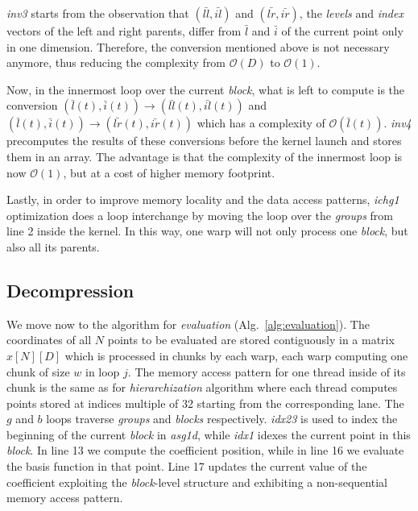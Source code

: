 \textit{inv3} starts from the observation that $(\bar{ll}, \bar{il})$ and
$(\bar{lr}, \bar{ir})$, the \textit{levels} and \textit{index} vectors of the
left and right parents, differ from $\bar{l}$ and $\bar{i}$ of the current point
only in one dimension. Therefore, the conversion mentioned above is not
necessary anymore, thus reducing the complexity from $\mathcal{O}(D)$ to
$\mathcal{O}(1)$.

Now, in the innermost loop over the current \textit{block}, what is left to
compute is the conversion $(\bar{l}(t), \bar{i}(t)) \rightarrow (\bar{ll}(t),
\bar{il}(t))$ and $(\bar{l}(t), \bar{i}(t)) \rightarrow (\bar{lr}(t),
\bar{ir}(t))$ which has a complexity of $\mathcal{O}(\bar{l}(t))$.
\textit{inv4} precomputes the results of these conversions before the kernel
launch and stores them in an array. The advantage is that the complexity of the
innermost loop is now $\mathcal{O}(1)$, but at a cost of higher memory
footprint.

Lastly, in order to improve memory locality and the data access patterns,
\textit{ichg1} optimization does a loop interchange by moving the loop over the
\textit{groups} from line 2 inside the kernel. In this way, one warp will not
only process one \textit{block}, but also all its parents.

\subsection{Decompression}

We move now to the algorithm for \textit{evaluation}
(Alg.~\ref{alg:evaluation}). The coordinates of all $N$ points to be evaluated
are stored contiguously in a matrix $x[N][D]$ which is processed in chunks by
each warp, each warp computing one chunk of size $w$ in loop $j$. The memory
access pattern for one thread inside of its chunk is the same as for
\textit{hierarchization} algorithm where each thread computes points stored at
indices multiple of 32 starting from the corresponding lane. The $g$ and $b$
loops traverse \textit{groups} and \textit{blocks} respectively. \textit{idx23}
is used to index the beginning of the current \textit{block} in \textit{asg1d},
while \textit{idx1} idexes the current point in this \textit{block}. In line 13
we compute the coefficient position, while in line 16 we evaluate the basis
function in that point. Line 17 updates the current value of the coefficient
exploiting the \textit{block}-level structure and exhibiting a non-sequential
memory access pattern.


